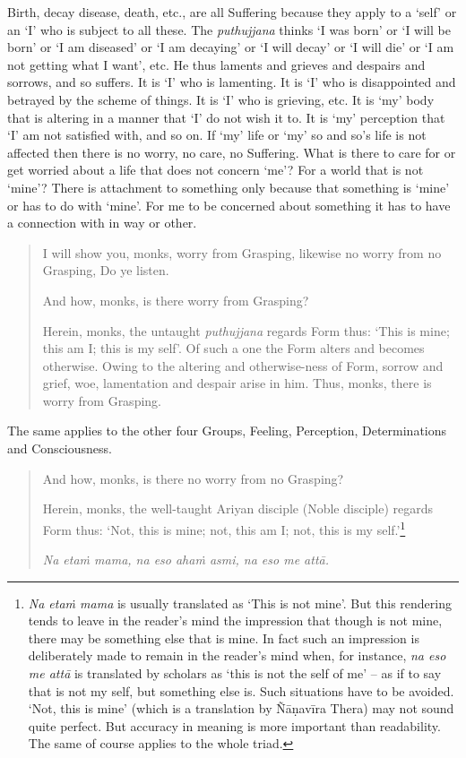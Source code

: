 Birth, decay disease, death, etc., are all Suffering because they apply to a `self' or an `I' who is subject to all these. The \emph{puthujjana} thinks `I was born' or `I will be born' or `I am diseased' or `I am decaying' or `I will decay' or `I will die' or `I am not getting what I want', etc. He thus laments and grieves and despairs and sorrows, and so suffers. It is `I' who is lamenting. It is `I' who is disappointed and betrayed by the scheme of things. It is `I' who is grieving, etc. It is `my' body that is altering in a manner that `I' do not wish it to. It is `my' perception that `I' am not satisfied with, and so on. If `my' life or `my' so and so's life is not affected then there is no worry, no care, no Suffering. What is there to care for or get worried about a life that does not concern `me'? For a world that is not `mine'? There is attachment to something only because that something is `mine' or has to do with `mine'. For me to be concerned about something it has to have a connection with  in  way or other.

\begin{quote}
I will show you, monks, worry from Grasping, likewise no worry from no Grasping, Do ye listen.

And how, monks, is there worry from Grasping?

Herein, monks, the untaught \emph{puthujjana} regards Form thus: `This is mine; this am I; this is my self'. Of such a one the Form alters and becomes otherwise. Owing to the altering and otherwise-ness of Form, sorrow and grief, woe, lamentation and despair arise in him. Thus, monks, there is worry from Grasping.
\end{quote}

The same applies to the other four Groups, Feeling, Perception, Determinations and Consciousness.

\begin{quote}
And how, monks, is there no worry from no Grasping?

Herein, monks, the well-taught Ariyan disciple (Noble disciple) regards Form thus: `Not, this is mine; not, this am I; not, this is my self.'\footnote{\emph{Na etaṁ mama} is usually translated as `This is not mine'. But this rendering tends to leave in the reader's mind the impression that though  is not mine, there may be something else that is mine. In fact such an impression is deliberately made to remain in the reader's mind when, for instance, \emph{na eso me attā} is translated by scholars as `this is not the self of me' -- as if to say that  is not my self, but something else is. Such situations have to be avoided. `Not, this is mine' (which is a translation by Ñāṇavīra Thera) may not sound quite perfect. But accuracy in meaning is more important than readability. The same of course applies to the whole triad.}

\emph{Na etaṁ mama, na eso ahaṁ asmi, na eso me attā.}
\end{quote}

